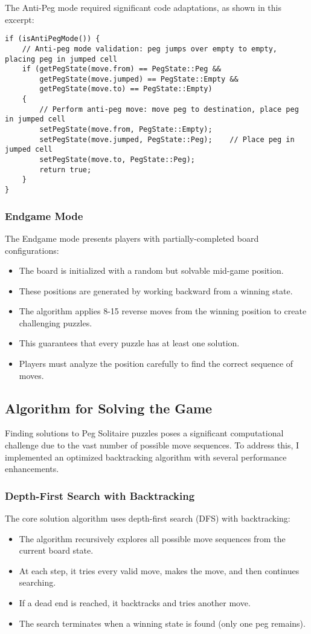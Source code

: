 The Anti-Peg mode required significant code adaptations, as shown in this excerpt:
\begin{verbatim}
if (isAntiPegMode()) {
    // Anti-peg mode validation: peg jumps over empty to empty, placing peg in jumped cell
    if (getPegState(move.from) == PegState::Peg &&
        getPegState(move.jumped) == PegState::Empty &&
        getPegState(move.to) == PegState::Empty)
    {
        // Perform anti-peg move: move peg to destination, place peg in jumped cell
        setPegState(move.from, PegState::Empty);
        setPegState(move.jumped, PegState::Peg);    // Place peg in jumped cell
        setPegState(move.to, PegState::Peg);
        return true;
    }
}
\end{verbatim}

\subsubsection{Endgame Mode}
The Endgame mode presents players with partially-completed board configurations:
\begin{itemize}
    \item The board is initialized with a random but solvable mid-game position.
    \item These positions are generated by working backward from a winning state.
    \item The algorithm applies 8-15 reverse moves from the winning position to create challenging puzzles.
    \item This guarantees that every puzzle has at least one solution.
    \item Players must analyze the position carefully to find the correct sequence of moves.
\end{itemize}

\subsection{Algorithm for Solving the Game}
Finding solutions to Peg Solitaire puzzles poses a significant computational challenge due to the vast number of possible move sequences. To address this, I implemented an optimized backtracking algorithm with several performance enhancements.

\subsubsection{Depth-First Search with Backtracking}
The core solution algorithm uses depth-first search (DFS) with backtracking:
\begin{itemize}
    \item The algorithm recursively explores all possible move sequences from the current board state.
    \item At each step, it tries every valid move, makes the move, and then continues searching.
    \item If a dead end is reached, it backtracks and tries another move.
    \item The search terminates when a winning state is found (only one peg remains).
\end{itemize}

